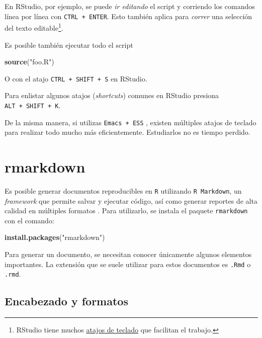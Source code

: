 \documentclass[]{article}
\newenvironment{Shaded}{\begin{snugshade}}{\end{snugshade}}
\newcommand{\KeywordTok}[1]{\textcolor[rgb]{0.13,0.29,0.53}{\textbf{#1}}}
\newcommand{\StringTok}[1]{\textcolor[rgb]{0.31,0.60,0.02}{#1}}
\newcommand{\NormalTok}[1]{#1}
\let\rmarkdownfootnote\footnote%
\def\footnote{\protect\rmarkdownfootnote}
\begin{document}
En RStudio, por ejemplo, se puede \emph{ir editando} el script y
corriendo los comandos línea por línea con \texttt{CTRL\ +\ ENTER}. Esto
también aplica para \emph{correr} una selección del texto
editable\footnote{RStudio tiene muchos
  \href{https://support.rstudio.com/hc/en-us/articles/200711853-Keyboard-Shortcuts}{atajos
  de teclado} que facilitan el trabajo.}.

Es posible también ejecutar todo el script

\begin{Shaded}
\begin{Highlighting}[]
\KeywordTok{source}\NormalTok{(}\StringTok{"foo.R"}\NormalTok{)}
\end{Highlighting}
\end{Shaded}

O con el atajo \texttt{CTRL\ +\ SHIFT\ +\ S} en RStudio.

Para enlistar algunos atajos (\emph{shortcuts}) comunes en RStudio
presiona \texttt{ALT\ +\ SHIFT\ +\ K}.

De la misma manera, si utilizas \texttt{Emacs\ +\ ESS}
\parencite{rossini2004ess}, existen múltiples atajos de teclado para
realizar todo mucho más eficientemente. Estudiarlos no es tiempo
perdido.

\section{rmarkdown}\label{rmarkdown}

Es posible generar documentos reproducibles en \texttt{R} utilizando
\texttt{R\ Markdown}, un \emph{framework} que permite salvar y ejecutar
código, así como generar reportes de alta calidad en múltiples formatos
\parencite{rmarkdownconcept}. Para utilizarlo, se instala el paquete
\texttt{rmarkdown} con el comando:

\begin{Shaded}
\begin{Highlighting}[]
\KeywordTok{install.packages}\NormalTok{(}\StringTok{"rmarkdown"}\NormalTok{)}
\end{Highlighting}
\end{Shaded}

Para generar un documento, se necesitan conocer únicamente algunos
elementos importantes. La extensión que se suele utilizar para estos
documentos es \texttt{.Rmd} o \texttt{.rmd}.

\subsection{Encabezado y formatos}\label{encabezado-y-formatos}
\end{document}

